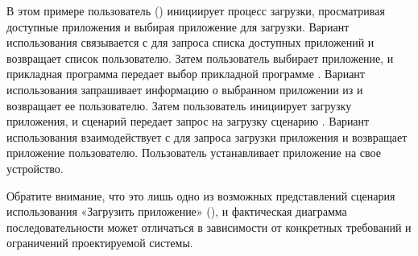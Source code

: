 \documentclass[letterpaper,10pt,russian]{sphinxmanual}
\begin{document}
\sphinxAtStartPar
В этом примере пользователь () инициирует процесс загрузки, просматривая доступные приложения и выбирая приложение для загрузки. Вариант использования  связывается с  для запроса списка доступных приложений и возвращает список пользователю. Затем пользователь выбирает приложение, и прикладная программа  передает выбор прикладной программе . Вариант использования  запрашивает информацию о выбранном приложении из  и возвращает ее пользователю. Затем пользователь инициирует загрузку приложения, и сценарий  передает запрос на загрузку сценарию . Вариант использования  взаимодействует с  для запроса загрузки приложения и возвращает приложение пользователю. Пользователь устанавливает приложение на свое устройство.

\sphinxAtStartPar
Обратите внимание, что это лишь одно из возможных представлений сценария использования «Загрузить приложение» (), и фактическая диаграмма последовательности может отличаться в зависимости от конкретных требований и ограничений проектируемой системы.
\end{document}
